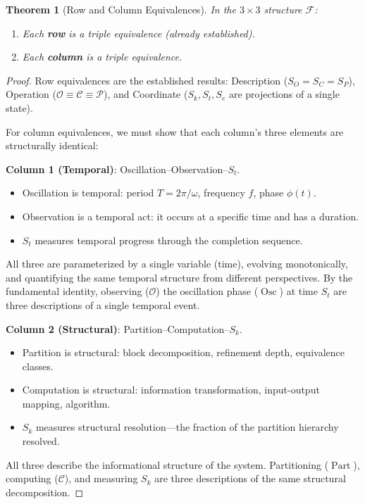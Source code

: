\documentclass[12pt,twocolumn]{article}
\newtheorem{theorem}{Theorem}[section]
\DeclareMathOperator{\Part}{Part}
\DeclareMathOperator{\Osc}{Osc}
\begin{document}
\begin{theorem}[Row and Column Equivalences]
\label{thm:row_column}
In the $3 \times 3$ structure $\mathcal{F}$:
\begin{enumerate}
\item Each \textbf{row} is a triple equivalence (already established).
\item Each \textbf{column} is a triple equivalence.
\end{enumerate}
\end{theorem}

\begin{proof}
Row equivalences are the established results: Description ($S_O = S_C = S_P$), Operation ($\mathcal{O} \equiv \mathcal{C} \equiv \mathcal{P}$), and Coordinate ($S_k, S_t, S_e$ are projections of a single state).

For column equivalences, we must show that each column's three elements are structurally identical:

\textbf{Column 1 (Temporal)}: Oscillation--Observation--$S_t$.
\begin{itemize}
\item Oscillation is temporal: period $T = 2\pi/\omega$, frequency $f$, phase $\phi(t)$.
\item Observation is a temporal act: it occurs at a specific time and has a duration.
\item $S_t$ measures temporal progress through the completion sequence.
\end{itemize}
All three are parameterized by a single variable (time), evolving monotonically, and quantifying the same temporal structure from different perspectives. By the fundamental identity, observing ($\mathcal{O}$) the oscillation phase ($\Osc$) at time $S_t$ are three descriptions of a single temporal event.

\textbf{Column 2 (Structural)}: Partition--Computation--$S_k$.
\begin{itemize}
\item Partition is structural: block decomposition, refinement depth, equivalence classes.
\item Computation is structural: information transformation, input-output mapping, algorithm.
\item $S_k$ measures structural resolution---the fraction of the partition hierarchy resolved.
\end{itemize}
All three describe the informational structure of the system. Partitioning ($\Part$), computing ($\mathcal{C}$), and measuring $S_k$ are three descriptions of the same structural decomposition.


\end{proof}
\end{document}
